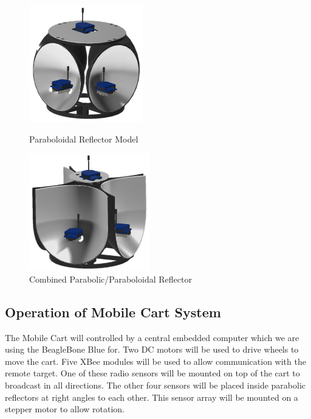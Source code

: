 \begin{figure}[h!]
  \centering
  \begin{minipage}[t]{0.5\textwidth}
    \centering
    \includegraphics[height=2in]{figs/img/paraboloidalReflector}
    \captionsetup{width=\textwidth, justification=raggedright}
    \caption{Paraboloidal Reflector Model}
    \label{fig:parabolodialReflector}
  \end{minipage}
  \begin{minipage}[t]{0.4\textwidth}
    \centering
    \includegraphics[height=2in]{figs/img/parabolicReflector}
    \captionsetup{width=\textwidth, justification=raggedright}
    \caption{Combined Parabolic/Paraboloidal Reflector}
    \label{fig:parabolicReflector}
  \end{minipage}
\end{figure}

\subsection{Operation of Mobile Cart System}
The Mobile Cart will controlled by a central embedded computer which we are using the BeagleBone Blue for. Two DC motors will be used to drive wheels to move the cart. Five XBee modules will be used to allow communication with the remote target. One of these radio sensors will be mounted on top of the cart to broadcast in all directions. The other four sensors will be placed inside parabolic reflectors at right angles to each other. This sensor array will be mounted on a stepper motor to allow rotation.


